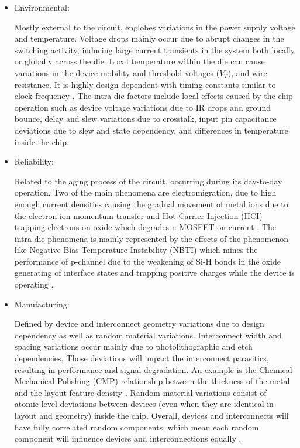 \documentclass[diss,pgmicro,english]{iiufrgs}
\begin{document}
\begin{itemize}

\item Environmental:

		Mostly external to the circuit, englobes variations in the power supply voltage and temperature. Voltage drops mainly occur due to abrupt changes in the switching activity, inducing large current transients in the system both locally or globally across the die. Local temperature within the die can cause variations in the device mobility and threshold voltages ($V_T$), and wire resistance. It is highly design dependent with timing constants similar to clock frequency \cite{nassif:08} \cite{bernstein2006high}. The intra-die factors include local effects caused by the chip operation such as device voltage variations due to IR drops and ground bounce, delay and slew variations due to crosstalk, input pin capacitance deviations due to slew and state dependency, and differences in temperature inside the chip.

\item Reliability:

	Related to the aging process of the circuit, occurring during its day-to-day operation. Two of the main phenomena are electromigration, due to high enough current densities causing the gradual movement of metal ions due to the electron-ion momentum transfer \cite{young1994failure} \cite{posser2016electromigration} and Hot Carrier Injection (HCI) trapping electrons on oxide which degrades n-MOSFET on-current \cite{takeda1983empirical} \cite{nassif:08} \cite{bernstein2006high}. The intra-die phenomena is mainly represented by the effects of the phenomenon like Negative Bias Temperature Instability (NBTI) which mines the performance of p-channel due to the weakening of Si-H bonds in the oxide generating of interface states and trapping positive charges while the device is operating \cite{wang2008statistical}.

\item Manufacturing:

Defined by device and interconnect geometry variations due to design dependency as well as random material variations. Interconnect width and spacing variations occur mainly due to photolithographic and etch dependencies. Those deviations will impact the interconnect parasitics, resulting in performance and signal degradation. An example is the Chemical-Mechanical Polishing (CMP) relationship between the thickness of the metal and the layout feature density \cite{stine1997analysis}.  Random material variations consist of atomic-level deviations between devices (even when they are identical in layout and geometry) inside the chip. Overall, devices and interconnects will have fully correlated random components, which mean each random component will influence devices and interconnections equally \cite{dietrich2011process}.


\end{itemize}
\end{document}
